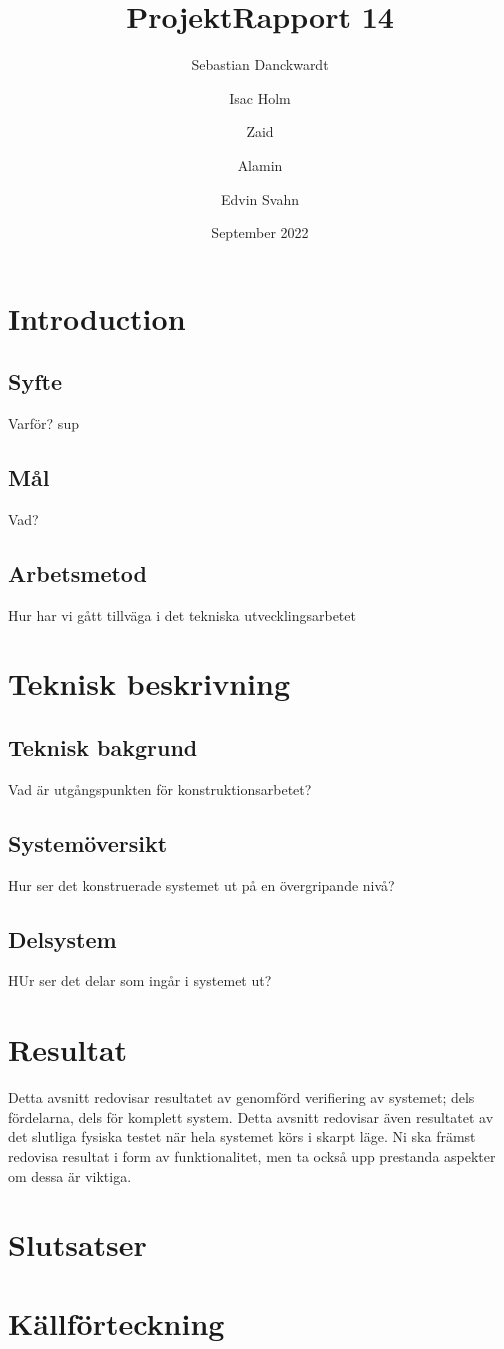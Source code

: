 \documentclass{article}
\title{ProjektRapport 14}
\author{Sebastian Danckwardt \and Isac Holm \and Zaid \and Alamin \and Edvin Svahn}
\date{September 2022}
\begin{document}
\maketitle

\section{Introduction}
\subsection{Syfte}
Varför? sup
\subsection{Mål}
Vad?
\subsection{Arbetsmetod}
Hur har vi gått tillväga i det tekniska utvecklingsarbetet
\section{Teknisk beskrivning}
\subsection{Teknisk bakgrund}
Vad är utgångspunkten för konstruktionsarbetet?
\subsection{Systemöversikt}
Hur ser det konstruerade systemet ut på en övergripande nivå?
\subsection{Delsystem}
HUr ser det delar som ingår i systemet ut?
\section{Resultat}
Detta avsnitt redovisar resultatet av genomförd verifiering av systemet; dels fördelarna, dels för 
komplett system. Detta avsnitt redovisar även resultatet av det slutliga fysiska testet när hela systemet 
körs i skarpt läge. Ni ska främst redovisa resultat i form av funktionalitet, men ta också upp prestanda 
aspekter om dessa är viktiga.  
\section{Slutsatser}
\section{Källförteckning}
\end{document}

